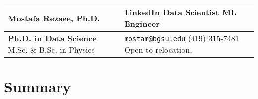 \documentclass[a4paper,10pt]{article}
\begin{document}
\noindent

\begin{tabular}{@{}p{3.5in} p{3.5in}@{}}

    \textbf{\LARGE Mostafa Rezaee, Ph.D.} & \hfill \href{https://www.linkedin.com/in/mostafa-rezaee/}{LinkedIn} \textbar{} Data Scientist \textbar{} ML Engineer \\
    
    \hline 
    
    \textbf{Ph.D. in Data Science} \textbar{} M.Sc. \& B.Sc. in Physics & \hfill \texttt{mostam@bgsu.edu} \textbar{} (419) 315-7481 \textbar{} Open to relocation.

\end{tabular}

\section*{Summary}
\end{document}
